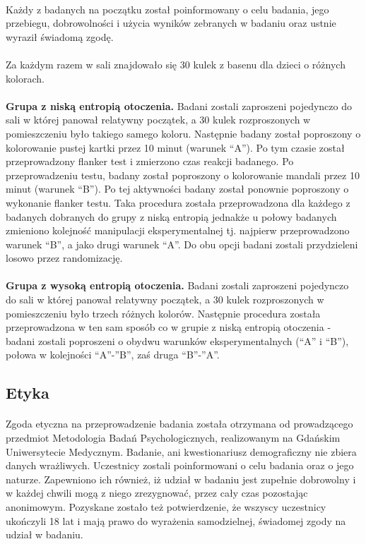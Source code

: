 \documentclass[12pt,a4paper,final,oneside,onecolumn,titlepage]{article}
\begin{document}
\paragraph{}
Każdy z badanych na początku został poinformowany o celu badania, jego przebiegu, dobrowolności i użycia wyników zebranych w badaniu oraz ustnie wyraził świadomą zgodę.
\paragraph{}
Za każdym razem w sali znajdowało się 30 kulek z basenu dla dzieci o różnych kolorach.
\paragraph{}
\textbf{Grupa z niską entropią otoczenia.} Badani zostali zaproszeni pojedynczo do sali w której panował relatywny początek, a 30 kulek rozproszonych w pomieszczeniu było takiego samego koloru. Następnie badany został poproszony o kolorowanie pustej kartki przez 10 minut (warunek “A”). Po tym czasie został przeprowadzony flanker test i zmierzono czas reakcji badanego. Po przeprowadzeniu testu, badany został poproszony o kolorowanie mandali przez 10 minut (warunek “B”). Po tej aktywności badany został ponownie poproszony o wykonanie flanker testu. Taka procedura została przeprowadzona dla każdego z badanych dobranych do grupy z niską entropią jednakże u połowy badanych zmieniono kolejność manipulacji eksperymentalnej tj. najpierw przeprowadzono warunek “B”, a jako drugi warunek “A”. Do obu opcji badani zostali przydzieleni losowo przez randomizację.
\paragraph{}
\textbf{Grupa z wysoką entropią otoczenia.} Badani zostali zaproszeni pojedynczo do sali w której panował relatywny początek, a  30 kulek rozproszonych w pomieszczeniu było trzech różnych kolorów. Następnie procedura została przeprowadzona w ten sam sposób co w grupie z niską entropią otoczenia - badani zostali poproszeni o obydwu warunków eksperymentalnych (“A” i “B”), połowa w kolejności “A”-”B”, zaś druga “B”-”A”.
\subsection*{\normalsize{\textbf{Etyka}}}
\paragraph{}
Zgoda etyczna na przeprowadzenie badania została otrzymana od prowadzącego przedmiot Metodologia Badań Psychologicznych, realizowanym na Gdańskim Uniwersytecie Medycznym. Badanie, ani kwestionariusz demograficzny nie zbiera danych wrażliwych. Uczestnicy zostali poinformowani o celu badania oraz o jego naturze. Zapewniono ich również, iż udział w badaniu jest zupełnie dobrowolny i w każdej chwili mogą z niego zrezygnować, przez cały czas pozostając anonimowym. Pozyskane zostało też potwierdzenie, że wszyscy uczestnicy ukończyli 18 lat i mają prawo do wyrażenia samodzielnej, świadomej zgody na udział w badaniu. 
\end{document}
